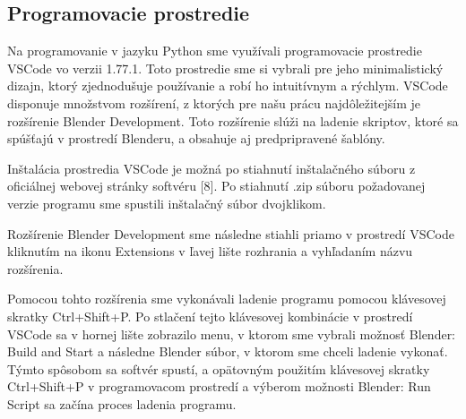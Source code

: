 \subsection{Programovacie prostredie}
Na programovanie v jazyku Python sme využívali programovacie prostredie VSCode vo verzii 1.77.1. Toto prostredie sme si vybrali pre jeho minimalistický dizajn, ktorý zjednodušuje používanie a robí ho intuitívnym a rýchlym. VSCode disponuje množstvom rozšírení, z ktorých pre našu prácu najdôležitejším je rozšírenie Blender Development. Toto rozšírenie slúži na ladenie skriptov, ktoré sa spúšťajú v prostredí Blenderu, a obsahuje aj predpripravené šablóny.

Inštalácia prostredia VSCode je možná po stiahnutí inštalačného súboru z oficiálnej webovej stránky softvéru [8]. Po stiahnutí .zip súboru požadovanej verzie programu sme spustili inštalačný súbor dvojklikom.

Rozšírenie Blender Development sme následne stiahli priamo v prostredí VSCode kliknutím na ikonu Extensions v ľavej lište rozhrania a vyhľadaním názvu rozšírenia.

Pomocou tohto rozšírenia sme vykonávali ladenie programu pomocou klávesovej skratky Ctrl+Shift+P. Po stlačení tejto klávesovej kombinácie v prostredí VSCode sa v hornej lište zobrazilo menu, v ktorom sme vybrali možnosť Blender: Build and Start a následne Blender súbor, v ktorom sme chceli ladenie vykonať. Týmto spôsobom sa softvér spustí, a opätovným použitím klávesovej skratky Ctrl+Shift+P v programovacom prostredí a výberom možnosti Blender: Run Script sa začína proces ladenia programu.
